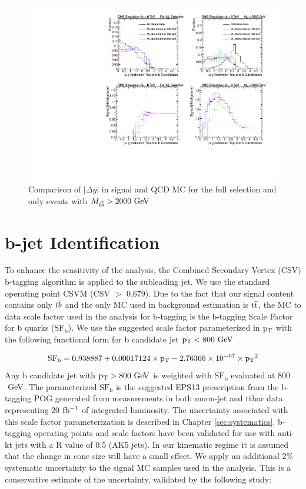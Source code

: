 \begin{figure}[htb]
\centering
\includegraphics[width=1.0\textwidth]{AN-13-004/figs/drapCompqcdandsignal}
\caption{Comparison of $|\Delta y|$ in signal and QCD MC for the full selection and only events with $M_{{t\overline{b}}} > 2000~\mathrm{GeV}$}
\label{figs:CutComp}
\end{figure}



\section{b-jet Identification}
\label{sec:btagging}
To enhance the sensitivity of the analysis, the Combined Secondary Vertex (CSV) b-tagging algorithm is applied to the subleading jet. We use the standard operating point CSVM (CSV $>$ 0.679).
Due to the fact that our signal content 
contains only ${t\overline{b}}$ and the only MC used in background estimation is $\mathrm{t\overline{t}}$, the MC to data scale factor used in the analysis for b-tagging 
is the b-tagging Scale Factor for b quarks ($\mathrm{SF_b}$).  We use the suggested scale factor parameterized in $\mathrm{p_{T}}$ with the following functional form for 
b candidate jet $\mathrm{p_{T}} < 800~\mathrm{GeV}$

\begin{eqnarray}
\mathrm{SF_b = 0.938887 + 0.00017124\times \mathrm{p_{T}} - 2.76366 \times 10^{-07} \times \mathrm{p_{T}}^2} 
\end{eqnarray}
Any b candidate jet with $\mathrm{p_{T}} > 800~\mathrm{GeV}$ is weighted with $\mathrm{SF_b}$ evaluated at 800$~\mathrm{GeV}$.  The parameterized $\mathrm{SF_b}$ is the 
suggested EPS13 prescription \cite{CMS-PAS-BTV-13-001} from the b-tagging POG generated from measurements in both muon-jet and ttbar data representing 20$~\mathrm{fb^{-1}}$ of integrated 
luminosity. The uncertainty associated with this scale factor parameterization is described in Chapter \ref{sec:systematics}.  b-tagging operating points 
and scale factors have been validated for use with anti-kt jets with a R value of 0.5 (AK5 jets).  In our kinematic regime it is assumed that the change in cone size 
will have a small effect. We apply an additional $2\%$ systematic uncertainty to the signal MC samples used in the analysis. This is a conservative estimate of the uncertainty, validated by the following study: 

